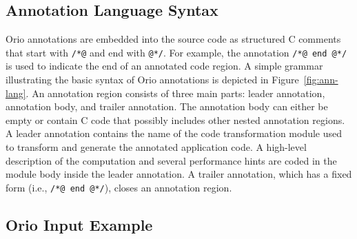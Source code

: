 
\subsection{Annotation Language Syntax} 
\label{sec:ann-lang}

Orio annotations are embedded into the source code as structured C comments
that start with \texttt{/*@} and end with \texttt{@*/}. For example,
the annotation \texttt{/*@ end @*/} is used to indicate the end of an
annotated code region. A simple grammar illustrating the basic syntax of Orio
annotations is depicted in Figure~\ref{fig:ann-lang}. An annotation region
consists of three main parts: leader annotation, annotation body, and trailer
annotation. The annotation body can either be empty or contain C code that
possibly includes other nested annotation regions. A leader annotation
contains the name of the code transformation module used to transform and
generate the annotated application code. A high-level description of the
computation and several performance hints are coded in the module body inside
the leader annotation. A trailer annotation, which has a fixed form (i.e.,
\texttt{/*@ end @*/}), closes an annotation region.

\subsection{Orio Input Example}
\label{sec:example}

